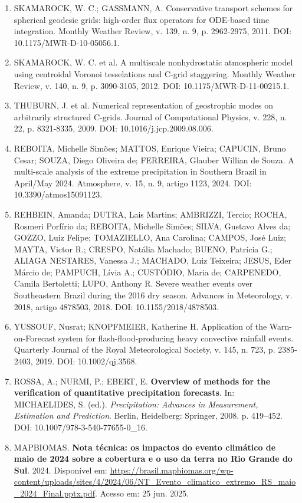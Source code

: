 \documentclass[12pt,a4paper,oneside]{book}
\begin{document}
\begin{enumerate}
\item
  SKAMAROCK, W. C.; GASSMANN, A. Conservative transport schemes for spherical geodesic grids: high-order flux operators for ODE-based time integration. Monthly Weather Review, v. 139, n. 9, p. 2962-2975, 2011. DOI: 10.1175/MWR-D-10-05056.1.
\item
  SKAMAROCK, W. C. et al. A multiscale nonhydrostatic atmospheric model using centroidal Voronoi tesselations and C-grid staggering. Monthly Weather Review, v. 140, n. 9, p. 3090-3105, 2012. DOI: 10.1175/MWR-D-11-00215.1.
\item
  THUBURN, J. et al. Numerical representation of geostrophic modes on arbitrarily structured C-grids. Journal of Computational Physics, v. 228, n. 22, p. 8321-8335, 2009. DOI: 10.1016/j.jcp.2009.08.006.
\item
  REBOITA, Michelle Simões; MATTOS, Enrique Vieira; CAPUCIN, Bruno Cesar; SOUZA, Diego Oliveira de; FERREIRA, Glauber Willian de Souza. A multi-scale analysis of the extreme precipitation in Southern Brazil in April/May 2024. Atmosphere, v. 15, n. 9, artigo 1123, 2024. DOI: 10.3390/atmos15091123.
\item
  REHBEIN, Amanda; DUTRA, Lais Martins; AMBRIZZI, Tercio; ROCHA, Rosmeri Porfírio da; REBOITA, Michelle Simões; SILVA, Gustavo Alves da; GOZZO, Luiz Felipe; TOMAZIELLO, Ana Carolina; CAMPOS, José Luiz; MAYTA, Victor R.; CRESPO, Natália Machado; BUENO, Patrícia G.; ALIAGA NESTARES, Vanessa J.; MACHADO, Luiz Teixeira; JESUS, Eder Márcio de; PAMPUCH, Lívia A.; CUSTÓDIO, Maria de; CARPENEDO, Camila Bertoletti; LUPO, Anthony R. Severe weather events over Southeastern Brazil during the 2016 dry season. Advances in Meteorology, v. 2018, artigo 4878503, 2018. DOI: 10.1155/2018/4878503.
\item
  YUSSOUF, Nusrat; KNOPFMEIER, Katherine H. Application of the Warn-on-Forecast system for flash-flood-producing heavy convective rainfall events. Quarterly Journal of the Royal Meteorological Society, v. 145, n. 723, p. 2385-2403, 2019. DOI: 10.1002/qj.3568.
\item
  ROSSA, A.; NURMI, P.; EBERT, E. \textbf{Overview of methods for the verification of quantitative precipitation forecasts}. In: MICHAELIDES, S. (ed.). \emph{Precipitation: Advances in Measurement, Estimation and Prediction}. Berlin, Heidelberg: Springer, 2008. p. 419--452. DOI: 10.1007/978-3-540-77655-0\_16.
\item
  MAPBIOMAS. \textbf{Nota técnica: os impactos do evento climático de maio de 2024 sobre a cobertura e o uso da terra no Rio Grande do Sul}. 2024. Disponível em: \url{https://brasil.mapbiomas.org/wp-content/uploads/sites/4/2024/06/NT\_Evento\_climatico\_extremo\_RS\_maio\_2024\_Final.pptx.pdf}. Acesso em: 25 jun. 2025.
\end{enumerate}
\end{document}
